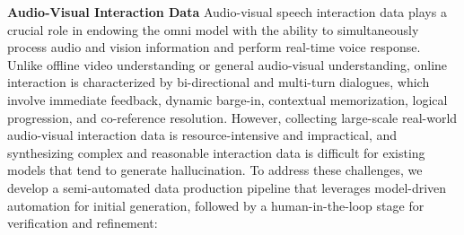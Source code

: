 \documentclass{article}
\begin{document}
\textbf{Audio-Visual Interaction Data}
Audio-visual speech interaction data plays a crucial role in endowing the omni model with the ability to simultaneously process audio and vision information and perform real-time voice response. Unlike offline video understanding or general audio-visual understanding, online interaction is characterized by bi-directional and multi-turn dialogues, which involve immediate feedback, dynamic barge-in, contextual memorization, logical progression, and co-reference resolution. However, collecting large-scale real-world audio-visual interaction data is resource-intensive and impractical, and synthesizing complex and reasonable interaction data is difficult for existing models that tend to generate hallucination. To address these challenges, we develop a semi-automated data production pipeline that leverages model-driven automation for initial generation, followed by a human-in-the-loop stage for verification and refinement:
\end{document}
